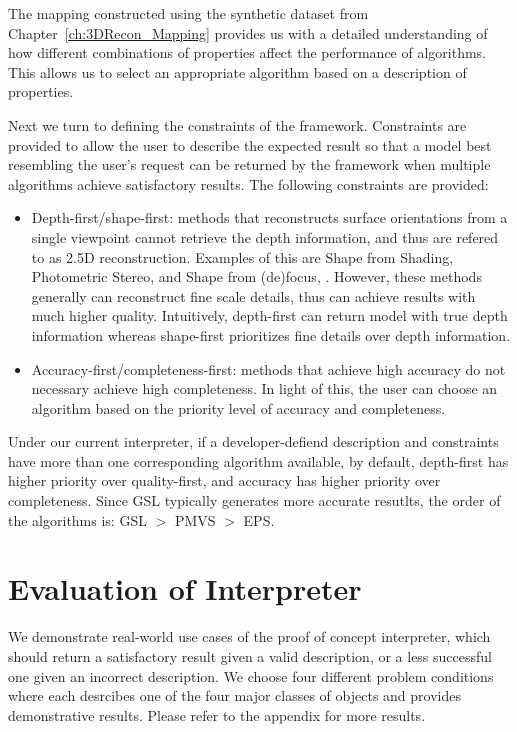 The mapping constructed using the synthetic dataset from Chapter~\ref{ch:3DRecon_Mapping} provides us with a detailed understanding of how different combinations of properties affect the performance of algorithms. This allows us to select an appropriate algorithm based on a description of properties.

Next we turn to defining the constraints of the framework. Constraints are provided to allow the user to describe the expected result so that a model best resembling the user's request can be returned by the framework when multiple algorithms achieve satisfactory results. The following constraints are provided: 
\begin{itemize}
\item Depth-first/shape-first: methods that reconstructs surface orientations from a single viewpoint cannot retrieve the depth information, and thus are refered to as 2.5D reconstruction. Examples of this are Shape from Shading, Photometric Stereo, and Shape from (de)focus, \etc. However, these methods generally can reconstruct fine scale details, thus can achieve results with much higher quality. Intuitively, depth-first can return model with true depth information whereas shape-first prioritizes fine details over depth information.
\item Accuracy-first/completeness-first: methods that achieve high accuracy do not necessary achieve high completeness. In light of this, the user can choose an algorithm based on the priority level of accuracy and completeness.
\end{itemize}

Under our current interpreter, if a developer-defiend description and constraints have more than one corresponding algorithm available, by default, depth-first has higher priority over quality-first, and accuracy has higher priority over completeness. Since GSL typically generates more accurate resutlts, the order of the algorithms is: GSL $>$ PMVS $>$ EPS.

\section{Evaluation of Interpreter}
\label{sec:eval_interp}
We demonstrate real-world use cases of the proof of concept interpreter, which should return a satisfactory result given a valid description, or a less successful one given an incorrect description. We choose four different problem conditions where each desrcibes one of the four major classes of objects and provides demonstrative results. Please refer to the appendix for more results.

